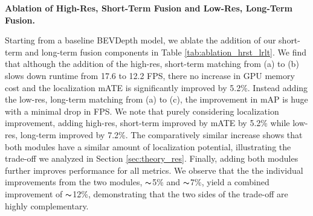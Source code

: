 \documentclass[runningheads, hyperfootnotes=false]{article}
\begin{document}
\noindent\textbf{Ablation of High-Res, Short-Term Fusion and Low-Res, Long-Term Fusion.}
\begin{table*}
\centering
\captionsetup{aboveskip=0pt}\captionsetup{belowskip=0pt}
\label{tab:ablation_hrst_lrlt}
\tiny
{}
\end{table*} Starting from a baseline BEVDepth model, we ablate the addition of our short-term and long-term fusion components in Table \ref{tab:ablation_hrst_lrlt}. We find that although the addition of the high-res, short-term matching from (a) to (b) slows down runtime from 17.6 to 12.2 FPS, there no increase in GPU memory cost and the localization mATE is significantly improved by 5.2\%. Instead adding the low-res, long-term matching from (a) to (c), the improvement in mAP is huge with a minimal drop in FPS. We note that purely considering localization improvement, adding high-res, short-term improved by mATE by 5.2\% while low-res, long-term improved by 7.2\%. The comparatively similar increase shows that both modules have a similar amount of localization potential, illustrating the trade-off we analyzed in Section \ref{sec:theory_res}. Finally, adding both modules further improves performance for all metrics. We observe that the the individual improvements from the two modules, $\thicksim$5\% and $\thicksim$7\%, yield a combined improvement of $\thicksim$12\%, demonstrating that the two sides of the trade-off are highly complementary.
\end{document}
